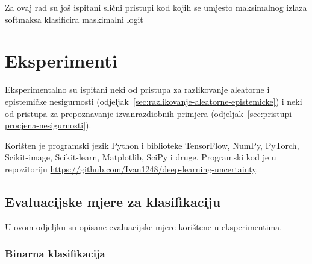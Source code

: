 \documentclass[utf8, diplomski, lmodern]{fer}
\begin{document}
Za ovaj rad su još ispitani slični pristupi kod kojih se umjesto maksimalnog izlaza softmaksa klasificira maskimalni logit



\chapter{Eksperimenti} \label{chap:eksperimenti}

Eksperimentalno su ispitani neki od pristupa za razlikovanje aleatorne i epistemičke nesigurnosti (odjeljak~\ref{sec:razlikovanje-aleatorne-epistemicke}) i neki od pristupa za prepoznavanje izvanrazdiobnih primjera (odjeljak~\ref{sec:pristupi-procjena-nesigurnosti}). 

Korišten je programski jezik Python i biblioteke TensorFlow, NumPy, PyTorch, Scikit-image, Scikit-learn, Matplotlib, SciPy i druge. Programski kod je u repozitoriju \url{https://github.com/Ivan1248/deep-learning-uncertainty}.


\section{Evaluacijske mjere za klasifikaciju}

U ovom odjeljku su opisane evaluacijske mjere korištene u eksperimentima.

\subsection{Binarna klasifikacija}
\end{document}
